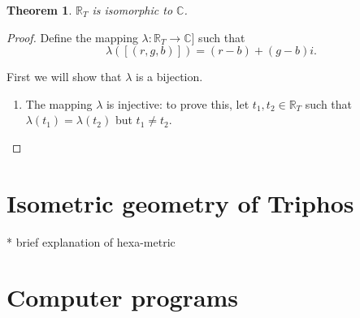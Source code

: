 \documentclass{article}
\theoremstyle{plain}
\newtheorem{theorem}{Theorem}
\theoremstyle{definition}
\newcommand{\Tri}{\mathbb{R}_T}
\begin{document}
	\begin{theorem}
		$\Tri$ is isomorphic to $\mathbb{C}$.
	\end{theorem}

	\begin{proof}
		Define the mapping \(\lambda: \Tri \to \mathbb{C}]\) such that
		\[\lambda([(r, g, b)]) = (r - b) + (g - b)i.\]

		First we will show that \(\lambda\) is a bijection.
		\begin{enumerate}
			\item The mapping \(\lambda\) is injective: to prove this, let
			$t_1, t_2 \in \Tri$ such that \(\lambda(t_1) = \lambda(t_2)\) but
			\(t_1 \neq t_2\).
		\end{enumerate}
	\end{proof}

	\section{Isometric geometry of Triphos}

	* brief explanation of hexa-metric

	\section{Computer programs}

	
	
\end{document}

